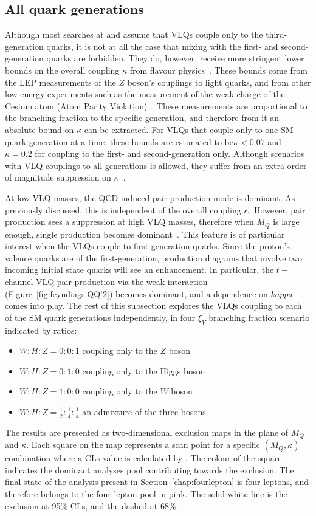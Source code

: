 \subsection{All quark generations}
Although most searches at \ATLAS and \CMS assume that VLQs couple only to the third-generation quarks, it is not at all the case that mixing with the first- and second-generation quarks are forbidden. They do, however, receive more stringent lower bounds on the overall coupling $\kappa$ from flavour physics~\cite{Buchkremer_2013}. These bounds come from the LEP measurements of the $Z$ boson's couplings to light quarks, and from other low energy experiments such as the measurement of the weak charge of the Cesium atom (Atom Parity Violation)~\cite{okada2012lhc}. These measurements are proportional to the branching fraction to the specific generation, and therefore from it an absolute bound on $\kappa$ can be extracted. For VLQs that couple only to one SM quark generation at a time, these bounds are estimated to be$\kappa<0.07$ and $\kappa=0.2$ for coupling to the first- and second-generation only. Although scenarios with VLQ couplings to all generations is allowed, they suffer from an extra order of magnitude suppression on $\kappa$~\cite{Buchkremer_2013}. 

At low VLQ masses, the QCD induced pair production mode is dominant. As previously discussed, this is independent of the overall coupling $\kappa$. However, pair production sees a suppression at high VLQ masses, therefore when $M_Q$ is large enough, single production becomes dominant~\cite{Panizzi:2014dwa}. This feature is of particular interest when the VLQs couple to first-generation quarks. Since the proton's valence quarks are of the first-generation, production diagrams that involve two incoming initial state quarks will see an enhancement. In particular, the $t-$channel VLQ pair production via the weak interaction (Figure~\ref{fig:feyndiags:QQ'2}) becomes dominant, and a dependence on $kappa$ comes into play. 
The rest of this subsection explores the VLQs coupling to each of the SM quark generations independently, in four $\xi_V$ branching fraction scenario indicated by ratios: 
\begin{itemize}
	\item{$W:H:Z=0:0:1$ coupling only to the $Z$ boson}
	\item{$W:H:Z=0:1:0$ coupling only to the Higgs boson}
	\item{$W:H:Z=1:0:0$ coupling only to the $W$ boson}
	\item{$W:H:Z=\frac{1}{2}:\frac{1}{4}:\frac{1}{4}$ an admixture of the three bosons}.
\end{itemize}
The results are presented as two-dimensional exclusion maps in the plane of $M_Q$ and $\kappa$. Each square on the map represents a scan point for a specific $(M_Q,\kappa)$ combination where a CLs value is calculated by \contur. The colour of the square indicates the dominant analyses pool contributing towards the exclusion. The final state of the \ATLAS analysis present in Section~\ref{chap:fourlepton} is four-leptons, and therefore belongs to the four-lepton pool in pink. The solid white line is the exclusion at 95\% CLs, and the dashed at 68\%. 

